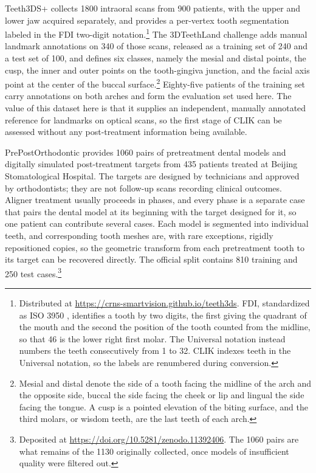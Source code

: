 \documentclass[10pt,a4paper]{article}
\begin{document}
Teeth3DS+ collects 1800 intraoral scans from 900 patients, with the upper and lower jaw acquired separately, and provides a per-vertex tooth segmentation labeled in the FDI two-digit notation.\footnote{Distributed at \url{https://crns-smartvision.github.io/teeth3ds}. FDI, standardized as ISO 3950 \citep{iso3950}, identifies a tooth by two digits, the first giving the quadrant of the mouth and the second the position of the tooth counted from the midline, so that 46 is the lower right first molar. The Universal notation instead numbers the teeth consecutively from 1 to 32. CLIK indexes teeth in the Universal notation, so the labels are renumbered during conversion.} The 3DTeethLand challenge adds manual landmark annotations on 340 of those scans, released as a training set of 240 and a test set of 100, and defines six classes, namely the mesial and distal points, the cusp, the inner and outer points on the tooth-gingiva junction, and the facial axis point at the center of the buccal surface.\footnote{Mesial and distal denote the side of a tooth facing the midline of the arch and the opposite side, buccal the side facing the cheek or lip and lingual the side facing the tongue. A cusp is a pointed elevation of the biting surface, and the third molars, or wisdom teeth, are the last teeth of each arch.} Eighty-five patients of the training set carry annotations on both arches and form the evaluation set used here. The value of this dataset here is that it supplies an independent, manually annotated reference for landmarks on optical scans, so the first stage of CLIK can be assessed without any post-treatment information being available.

PrePostOrthodontic provides 1060 pairs of pretreatment dental models and digitally simulated post-treatment targets from 435 patients treated at Beijing Stomatological Hospital. The targets are designed by technicians and approved by orthodontists; they are not follow-up scans recording clinical outcomes. Aligner treatment usually proceeds in phases, and every phase is a separate case that pairs the dental model at its beginning with the target designed for it, so one patient can contribute several cases. Each model is segmented into individual teeth, and corresponding tooth meshes are, with rare exceptions, rigidly repositioned copies, so the geometric transform from each pretreatment tooth to its target can be recovered directly. The official split contains 810 training and 250 test cases.\footnote{Deposited at \url{https://doi.org/10.5281/zenodo.11392406}. The 1060 pairs are what remains of the 1130 originally collected, once models of insufficient quality were filtered out.}
\end{document}
